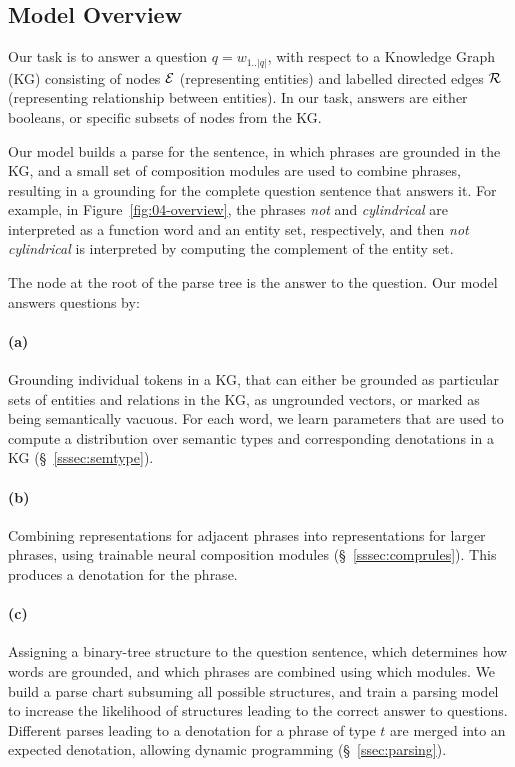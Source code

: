 \documentclass[main.tex]{subfiles}
\begin{document}
\subsection{Model Overview}
\label{sec:model}
Our task is to answer a question $q=w_{1..|q|}$, with respect to a Knowledge Graph (KG) consisting of nodes $\mathcal{E}$ (representing entities) and labelled directed edges $\mathcal{R}$ (representing relationship between entities). In our task, answers are either booleans, or specific subsets of nodes from the KG.

Our model builds a parse for the sentence, in which phrases are grounded in the KG, and a small set of composition modules are used to combine phrases, resulting in a grounding for the complete question sentence that answers it. For example, in Figure~\ref{fig:04-overview}, the phrases \emph{not} and \emph{cylindrical} are interpreted as a function word and an entity set, respectively, and then \emph{not cylindrical} is interpreted by computing the complement of the entity set.

The node at the root of the parse tree is the answer to the question.
Our model answers questions by:

\paragraph{(a)} Grounding individual tokens in a KG, that can either be grounded as particular sets of entities and relations in the KG, as ungrounded vectors, or marked as being semantically vacuous. For each word, we learn parameters that are used to compute a distribution over semantic types and corresponding denotations in a KG (\S~\ref{sssec:semtype}).

\paragraph{(b)} Combining representations for adjacent phrases into representations for larger phrases, using trainable neural composition modules (\S~\ref{sssec:comprules}). This produces a denotation for the phrase.

\paragraph{(c)} Assigning a binary-tree structure to the question sentence, which determines how words are grounded, and which phrases are combined using which modules. We build a parse chart subsuming all possible structures, and train a parsing model to increase the likelihood of structures leading to the correct answer to questions. Different parses leading to a denotation for a phrase of type $t$ are merged into an expected denotation, allowing dynamic programming (\S~\ref{ssec:parsing}).
\end{document}
